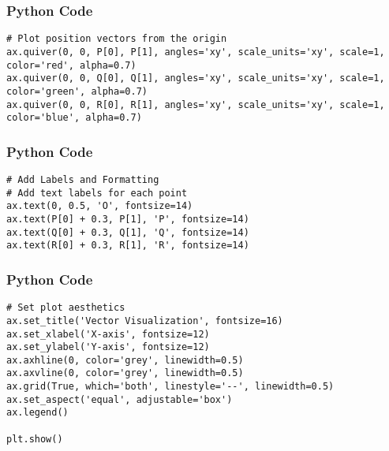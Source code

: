 \documentclass{beamer}
\begin{document}
\begin{frame}[fragile]
    \frametitle{Python Code}

    \begin{lstlisting}
# Plot position vectors from the origin
ax.quiver(0, 0, P[0], P[1], angles='xy', scale_units='xy', scale=1, color='red', alpha=0.7)
ax.quiver(0, 0, Q[0], Q[1], angles='xy', scale_units='xy', scale=1, color='green', alpha=0.7)
ax.quiver(0, 0, R[0], R[1], angles='xy', scale_units='xy', scale=1, color='blue', alpha=0.7)
\end{lstlisting}
\end{frame}
\begin{frame}[fragile]
    \frametitle{Python Code}

    \begin{lstlisting}
# Add Labels and Formatting 
# Add text labels for each point
ax.text(0, 0.5, 'O', fontsize=14)
ax.text(P[0] + 0.3, P[1], 'P', fontsize=14)
ax.text(Q[0] + 0.3, Q[1], 'Q', fontsize=14)
ax.text(R[0] + 0.3, R[1], 'R', fontsize=14)

\end{lstlisting}
\end{frame}
\begin{frame}[fragile]
    \frametitle{Python Code}

    \begin{lstlisting}
# Set plot aesthetics
ax.set_title('Vector Visualization', fontsize=16)
ax.set_xlabel('X-axis', fontsize=12)
ax.set_ylabel('Y-axis', fontsize=12)
ax.axhline(0, color='grey', linewidth=0.5)
ax.axvline(0, color='grey', linewidth=0.5)
ax.grid(True, which='both', linestyle='--', linewidth=0.5)
ax.set_aspect('equal', adjustable='box')
ax.legend()

plt.show()
\end{lstlisting}
\end{frame}
\end{document}
